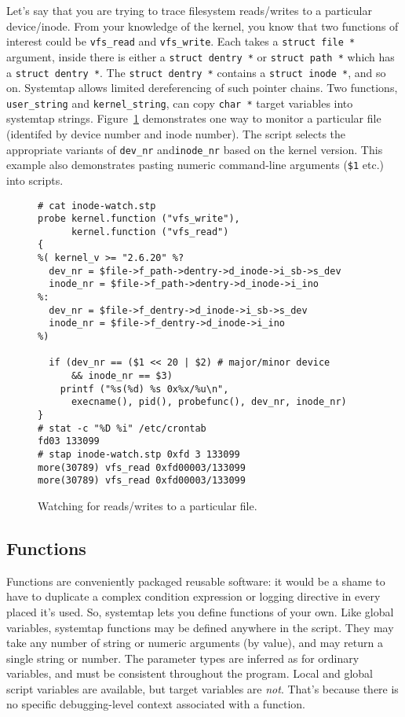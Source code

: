\documentclass{article}
\newenvironment{boxedminipage}%
    {\begin{makeimage}\begin{center}\begin{Sbox}\begin{minipage}}%
    {\end{minipage}\end{Sbox}\fbox{\TheSbox}\end{center}\end{makeimage}}
\renewcommand{\nomenclature}[2]{}
\begin{document}
Let's say that you are trying to trace filesystem reads/writes to a
particular device/inode.  From your knowledge of the kernel, you know
that two functions of interest could be \verb+vfs_read+ and
\verb+vfs_write+.  Each takes a \verb+struct file *+ argument, inside
there is either a \verb+struct dentry *+ or \verb+struct path *+ which
has a \verb+struct dentry *+.
The \verb+struct dentry *+ contains a \verb+struct inode *+, and
so on.
Systemtap allows limited dereferencing of such pointer chains.
Two functions, \verb+user_string+ and \verb+kernel_string+, can copy
\verb+char *+ target variables into systemtap strings.
Figure~\ref{fig:inode-watch} demonstrates one way to monitor a
particular file (identifed by device number and inode number).
The script selects the appropriate variants of \verb+dev_nr+
and\verb+inode_nr+ based on the kernel version.
This example also demonstrates pasting numeric command-line arguments
(\verb+$1+ etc.) into scripts.

\begin{figure}[!ht]
\begin{boxedminipage}{4.5in}
\begin{verbatim}
# cat inode-watch.stp
probe kernel.function ("vfs_write"),
      kernel.function ("vfs_read")
{
%( kernel_v >= "2.6.20" %?
  dev_nr = $file->f_path->dentry->d_inode->i_sb->s_dev
  inode_nr = $file->f_path->dentry->d_inode->i_ino
%:
  dev_nr = $file->f_dentry->d_inode->i_sb->s_dev
  inode_nr = $file->f_dentry->d_inode->i_ino
%)

  if (dev_nr == ($1 << 20 | $2) # major/minor device
      && inode_nr == $3)
    printf ("%s(%d) %s 0x%x/%u\n",
      execname(), pid(), probefunc(), dev_nr, inode_nr)
}
# stat -c "%D %i" /etc/crontab
fd03 133099
# stap inode-watch.stp 0xfd 3 133099
more(30789) vfs_read 0xfd00003/133099
more(30789) vfs_read 0xfd00003/133099
\end{verbatim}
\end{boxedminipage}
\caption{Watching for reads/writes to a particular file.}
\label{fig:inode-watch}
\end{figure}

\subsection{Functions}

Functions are conveniently packaged reusable software: it would be a
shame to have to duplicate a complex condition expression or logging
directive in every placed it's used.  So, systemtap lets you define
functions of your own.  Like global variables, systemtap functions may
be defined anywhere in the script.  They may take any number of string
or numeric arguments (by value), and may return a single string or
number.  The parameter types are inferred as for ordinary variables,
and must be consistent throughout the program.  Local and global
script variables are available, but target variables are {\em not}.
That's because there is no specific debugging-level context associated
with a function.
\nomenclature{function}{A clump of parametrized script statements that
may be repeatedly and recursively called from probe handlers and other
functions.}
\end{document}
